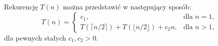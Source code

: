 \subsection{} %
Rekurencję $T(n)$ można przedstawić w następujący sposób:
\[
	T(n)=\left\{\begin{array}{ll}
		c_1, & \mbox{dla }n=1, \\
		T(\lceil n/2\rceil)+T(\lfloor n/2\rfloor)+c_2n, & \mbox{dla }n>1,
	\end{array}\right.
\]
dla pewnych stałych $c_1,c_2>0$.
% 
% 

